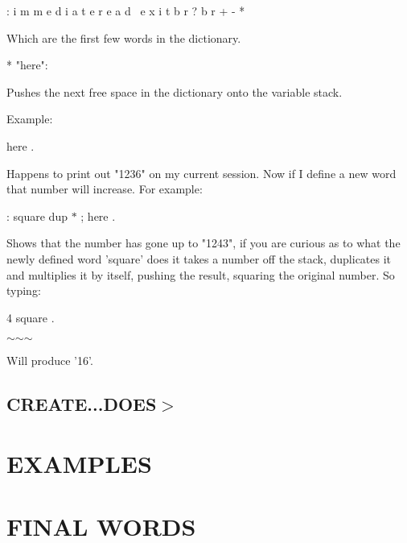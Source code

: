 \begin{DoxyVerb}
    :               i       m
    m       e       d       i
    a       t       e
    r       e       a       d
            \               e
    x       i       t
    b       r               ?
    b       r               +
            -               *

Which are the first few words in the dictionary.

* "here":

Pushes the next free space in the dictionary onto the variable stack.

Example:

    here .

Happens to print out "1236" on my current session. Now if I define a new word
that number will increase. For example:\end{DoxyVerb}


\-: square dup $\ast$ ; here .

\begin{DoxyVerb}Shows that the number has gone up to "1243", if you are curious as to what the
newly defined word 'square' does it takes a number off the stack, duplicates it
and multiplies it by itself, pushing the result, squaring the original number.
So typing:\end{DoxyVerb}


4 square .

$\sim$$\sim$$\sim$

Will produce '16'.

\subsection*{C\-R\-E\-A\-T\-E...D\-O\-E\-S$>$}

\section*{E\-X\-A\-M\-P\-L\-E\-S}

\section*{F\-I\-N\-A\-L W\-O\-R\-D\-S}